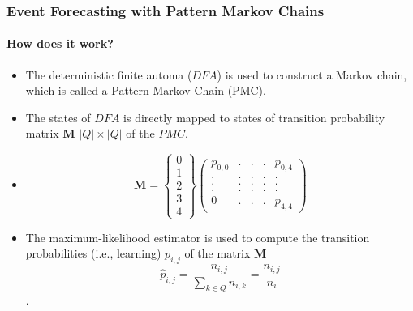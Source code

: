 \frame
{
	\frametitle{Event Forecasting with Pattern Markov
		Chains}
	\framesubtitle{How does it work?}
	\begin{itemize}
		\item<only@1> The  deterministic finite automa ($DFA$) is used to construct a Markov chain, which is called a Pattern Markov Chain (PMC).
		
		
		\item<only@1> The states of $DFA$ is directly mapped to states of  transition probability matrix $\boldsymbol{M}$  $\lvert Q \rvert \times \lvert Q \rvert$ of the $PMC$.
		
		\item<only@1> 
		\begin{equation*}
		\label{eq:matrix_example}
		\boldsymbol{M} = 
		\begin{Bmatrix} 
		0 \\ 1 \\ 2 \\ 3 \\4
		\end{Bmatrix}
		\begin{pmatrix} 
		p_{0,0}	    &. 		&. 		& . &  	p_{0,4} \\
		. 		    & .		& .	& .	& . \\
		.		    & .		& .		& .	& . \\
		.			& .		& .		& .	& .\\
		0			& .			& .		& .	&p_{4,4}
		\end{pmatrix}
		\end{equation*}
		
		\item<only@1> The maximum-likelihood estimator is used to compute the transition probabilities (i.e., learning) $p_{i,j}$ of the matrix $\boldsymbol{M}$ 
		\begin{equation}
		\label{eq:pi_estim}
		\hat{p}_{i,j}=\frac{n_{i,j}}{\sum_{k \in Q} n_{i,k}}=\frac{n_{i,j}}{n_{i}}
		\end{equation}. 	
		
	\end{itemize}
}

